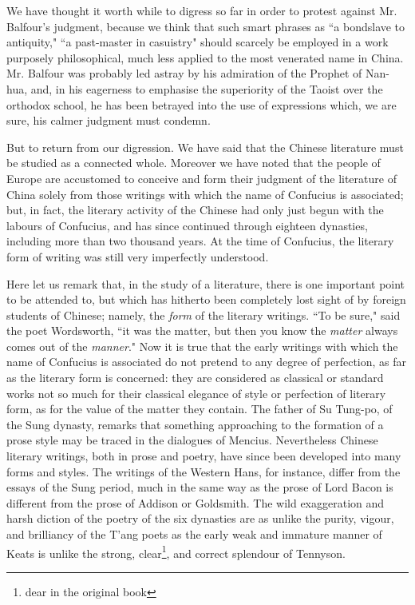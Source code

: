 We have thought it worth while to digress so far in order to protest against Mr. Balfour's judgment, because we think that such smart phrases as ``a bondslave to antiquity," ``a past-master in casuistry" should scarcely be employed in a work purposely philosophical, much less applied to the most venerated name in China.
Mr. Balfour was probably led astray by his admiration of the Prophet of Nan-hua, and, in his eagerness to emphasise the superiority of the Taoist over the orthodox school, he has been betrayed into the use of expressions which, we are sure, his calmer judgment must condemn.

But to return from our digression. 
We have said that the Chinese literature must be studied as a connected whole.
Moreover we have noted that the people of Europe are accustomed to conceive and form their judgment of the literature of China solely from those writings with which the name of Confucius is associated; but, in fact, the literary activity of the Chinese had only just begun with the labours of Confucius, and has since continued through eighteen dynasties, including more than two thousand years.
At the time of Confucius, the literary form of writing was still very imperfectly understood.

Here let us remark that, in the study of a literature, there is one important point to be attended to, but which has hitherto been completely lost sight of by foreign students of Chinese; namely, the \emph{form} of the literary writings.
``To be sure," said the poet Wordsworth, ``it was the matter, but then you know the \emph{matter} always comes out of the \emph{manner}."
Now it is true that the early writings with which the name of Confucius is associated do not pretend to any degree of perfection, as far as the literary form is concerned: they are considered as classical or standard works not so much for their classical elegance of style or perfection of literary form, as for the value of the matter they contain.
The father of Su Tung-po, of the Sung dynasty, remarks that something approaching to the formation of a prose style may be traced in the dialogues of Mencius.
Nevertheless Chinese literary writings, both in prose and poetry, have since been developed into many forms and styles.
The writings of the Western Hans, for instance, differ from the essays of the Sung period, much in the same way as the prose of Lord Bacon is different from the prose of Addison or Goldsmith.
The wild exaggeration and harsh diction of the poetry of the six dynasties are as unlike the purity, vigour, and brilliancy of the T'ang poets as the early weak and immature manner of Keats is unlike the strong, clear\footnote{dear in the original book}, and correct splendour of Tennyson.

